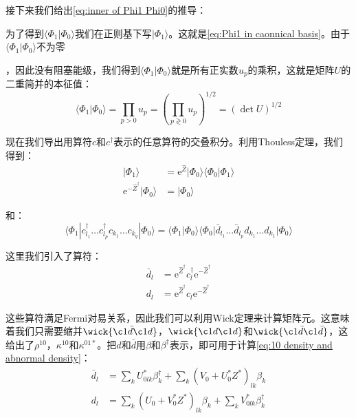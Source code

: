 接下来我们给出\ref{eq:inner of Phi1 Phi0}的推导：

为了得到$\langle\Phi_{1}|\Phi_{0}\rangle$我们在正则基下写$|\Phi_{1}\rangle$。这就是\ref{eq:Phi1 in caonnical basis}。由于$\langle\Phi_{1}|\Phi_{0}\rangle$不为零

，因此没有阻塞能级，我们得到$\langle\Phi_{1}|\Phi_{0}\rangle$就是所有正实数$u_{p}$的乘积，这就是矩阵$U$的二重简并的本征值：
\[
\langle\Phi_{1}|\Phi_{0}\rangle=\prod_{p>0}u_{p}=\left(\prod_{p\gtrless0}u_{p}\right)^{1/2}=(\det U)^{1/2}
\]

现在我们导出用算符$c$和$c^{\dagger}$表示的任意算符的交叠积分。利用Thouless定理，我们得到：
\begin{align*}
|\Phi_{1}\rangle & =\mathrm{e}^{\hat{Z}}|\Phi_{0}\rangle\langle\Phi_{0}|\Phi_{1}\rangle\\
\mathrm{e}^{-\hat{Z}^{\dagger}}|\Phi_{0}\rangle & =|\Phi_{0}\rangle
\end{align*}

和：
\[
\langle\Phi_{1}|c^{\dagger}_{l_{1}}\dots c^{\dagger}_{l_{p}}c_{k_{1}}\dots c_{k_{q}}|\Phi_{0}\rangle=\langle\Phi_{1}|\Phi_{0}\rangle\langle\Phi_{0}|\bar{d}_{l_{1}}\dots\bar{d}_{l_{p}}d_{k_{1}}\dots d_{k_{1}}|\Phi_{0}\rangle
\]

这里我们引入了算符：
\begin{align*}
\bar{d}_{l} & =\mathrm{e}^{\hat{Z}^{\dagger}}c^{\dagger}_{l}\mathrm{e}^{-\hat{Z}^{\dagger}}\\
d_{l} & =\mathrm{e}^{\hat{Z}^{\dagger}}c_{l}\mathrm{e}^{-\hat{Z}^{\dagger}}
\end{align*}

这些算符满足Fermi对易关系，因此我们可以利用Wick定理来计算矩阵元。这意味着我们只需要缩并$\wick{\c1{\bar{d}}\c1{d}}$，$\wick{\c1{d}\c1{d}}$和$\wick{\c1{\bar{d}}\c1{\bar{d}}}$，这给出了$\rho^{10}$，$\kappa^{10}$和$\kappa^{01*}$。把$d$和$\bar{d}$用$\beta$和$\beta^{\dagger}$表示，即可用于计算\ref{eq:10 density and abnormal density}：
\begin{align*}
\bar{d}_{l} & =\sum_{k}U^{*}_{0lk}\beta^{\dagger}_{k}+\sum_{k}(V_{0}+U^{*}_{0}Z^{*})_{lk}\beta_{k}\\
d_{l} & =\sum_{k}(U_{0}+V^{*}_{0}Z^{*})_{lk}\beta_{k}+\sum_{k}V^{*}_{0lk}\beta^{\dagger}_{k}
\end{align*}

